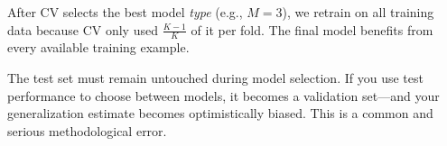 \begin{remark}
After CV selects the best model \textit{type} (e.g., $M = 3$), we retrain on all training data because CV only used $\frac{K-1}{K}$ of it per fold. The final model benefits from every available training example.
\end{remark}

\begin{remark}
The test set must remain untouched during model selection. If you use test performance to choose between models, it becomes a validation set---and your generalization estimate becomes optimistically biased. This is a common and serious methodological error.
\end{remark}

